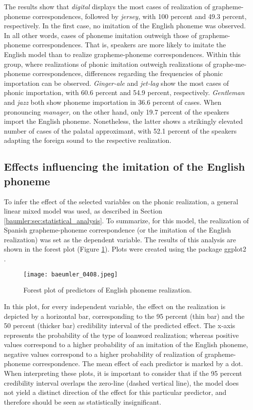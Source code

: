 \documentclass[output=paper]{langscibook}
\begin{document}
The results show that \textit{digital} displays the most cases of realization of grapheme-phoneme correspondences, followed by \textit{jersey,} with 100 percent and 49.3 percent, respectively. In the first case, no imitation of the English phoneme was observed. 
In all other words, cases of phoneme imitation outweigh those of grapheme-phoneme correspondences. That is, speakers are more likely to imitate the English model than to realize  grapheme-phoneme
 correspondences. Within this group, where realizations of phonic imitation outweigh realizations of graphe-me-phoneme correspondences, differences regarding the frequencies of phonic importation can be observed. \textit{Ginger-ale} and \textit{jet-lag} show the most cases of phonic importation, with 60.6 percent and 54.9 percent, respectively. \textit{Gentleman} and \textit{jazz} both show phoneme importation in 36.6 percent of cases. When pronouncing \textit{manager,} on the other hand, only 19.7 percent of the speakers import the English phoneme. Nonetheless, the latter shows a strikingly elevated number of cases of the palatal approximant, with 52.1 percent of the speakers adapting the foreign sound to the respective realization. 

\subsection{Effects influencing the imitation of the English phoneme}
To infer the effect of the selected variables on the phonic realization, a general linear mixed model was used, as described in Section \ref{baumler:sec:statistical_analysis}. To summarize, for this model, the realization of Spanish grapheme-phoneme correspondence (or the imitation of the English realization) was set as the dependent variable. The results of this analysis are shown in the forest plot (Figure
 \ref{baumler:fig:forest_plot}). Plots were created using the package ggplot2 \citep[]{ggplot}.

\begin{figure}
\texttt{[image: baeumler\_0408.jpeg]}
\caption{Forest plot of predictors of English phoneme realization.}
\label{baumler:fig:forest_plot}
\end{figure}

In this plot, for every independent variable, the effect on the realization is depicted by a horizontal bar, corresponding to the 95 percent (thin bar) and the 50 percent (thicker bar) credibility interval of the predicted effect. The x-axis represents the probability of the type of loanword realization; whereas positive values correspond to a higher probability of an imitation of the English phoneme, negative values correspond to a higher probability of realization of grapheme-phoneme correspondence. The mean effect of each predictor is marked by a dot. When interpreting these plots, it is important to consider that if the 95 percent credibility interval overlaps the zero-line (dashed vertical line), the model does not yield a distinct direction of the effect for this particular predictor, and therefore should be seen as statistically insignificant.
\end{document}
